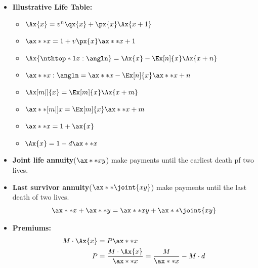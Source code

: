 \documentclass[10pt, french]{article}
\begin{document}
\begin{multicols*}{3}
\begin{itemize}[align=left,leftmargin=*]
    \item \textbf{Illustrative Life Table:}
    \begin{itemize}
        \item $\Ax{x} = v^n \qx{x} +  \px{x} \Ax{x+1}$
        \item $\ax**{x} = 1 + v \px{x} \ax**{x+1}$
        \item $\Ax{\nthtop*{1}{x}:\angln} = \Ax{x} - \Ex[n]{x} \Ax{x+n}$
        \item $\ax**{x:\angln} = \ax**{x} - \Ex[n]{x} \ax**{x+n}$
        \item $\Ax[m|]{x} = \Ex[m]{x} \Ax{x+m}$
        \item $\ax**[m|]{x} = \Ex[m]{x} \ax**{x+m}$
        \item $\ax**{x} = 1 + \ax{x}$
        \item $\Ax{x} = 1 - d \ax**{x}$
    \end{itemize}
    \columnbreak
    \item \textbf{Joint life annuity}($\ax**{xy}$) make payments until the earliest death pf two lives.
    \item \textbf{Last survivor annuity}($\ax**{\joint{xy}}$) make payments until the last death of two lives. \[ \ax**{x} + \ax**{y} = \ax**{xy} + \ax**{\joint{xy}} \]
    \item \textbf{Premiums:}
    \begin{align*}
        M \cdot \Ax{x} &= P \ax**{x} \\
        P &= \frac{M \cdot \Ax{x}}{\ax**{x}} = \frac{M}{\ax**{x}} - M \cdot d
    \end{align*}
\end{itemize}

\def\SectionColor{orange!80!white}

\end{multicols*}
\end{document}
